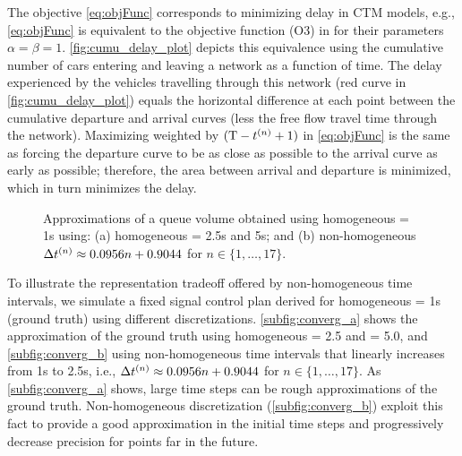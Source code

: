 The objective \eqref{eq:objFunc} corresponds to minimizing delay in CTM models,
e.g., \eqref{eq:objFunc} is equivalent to the objective function (O3) in
 for their parameters $\alpha = \beta = 1$.
%
\cref{fig:cumu_delay_plot} depicts this equivalence using the cumulative number
of cars entering and leaving a network as a function of time.
%
The delay experienced by the vehicles travelling through this network (red curve
in \cref{fig:cumu_delay_plot}) equals the horizontal difference at each point
between the cumulative departure and arrival curves (less the free flow travel
time through the network).
%
Maximizing  weighted by $(\TMAX - \tn +1)$ in \eqref{eq:objFunc} is the
same as forcing the departure curve to be as close as possible to the arrival
curve as early as possible; therefore, the area between arrival and departure is
minimized, which in turn minimizes the delay.







\begin{figure*}[t!]
\centering
{}
\label{fig:conv}
%
\caption{Approximations of a queue volume obtained using homogeneous
\DT[] = 1s using: (a) homogeneous \DT[] = 2.5s and 5s; and (b) non-homogeneous
$\DT[n] \approx 0.0956n + 0.9044$ for $n \in \{1,\dots,17\}$.}
%
\end{figure*}


To illustrate the representation tradeoff offered by non-homogeneous time
intervals, we simulate a fixed signal control plan derived for homogeneous
\DT[n] = 1s (ground truth) using different discretizations.
%
\cref{subfig:converg_a} shows the approximation of the ground truth using
homogeneous \DT[] = 2.5 and \DT[] = 5.0, and \cref{subfig:converg_b} using
non-homogeneous time intervals that linearly increases from 1s to 2.5s, i.e.,
$\DT[n] \approx 0.0956n + 0.9044$ for $n \in \{1,\dots,17\}$.
%
As \cref{subfig:converg_a} shows, large time steps can be rough approximations
of the ground truth.
%
Non-homogeneous discretization (\cref{subfig:converg_b}) exploit this fact to
provide a good approximation in the initial time steps and progressively
decrease precision for points far in the future.






